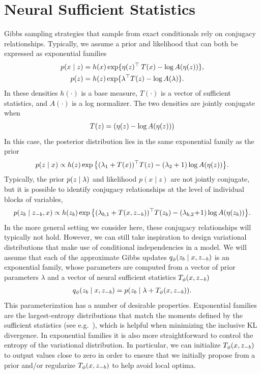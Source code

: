 \documentclass[anonymous=false, %
               format=acmsmall, %
               review=true, %
               screen=true, %
               nonacm=true]{acmart}
\theoremstyle{definition}
\begin{document}
\section{Neural Sufficient Statistics}
Gibbs sampling strategies that sample from exact conditionals rely on conjugacy relationships. Typically, we assume a prior and likelihood that can both be expressed as exponential families
\begin{align*}
    p(x \mid z) 
    &= 
    h(x) \exp \{ 
        \eta(z)^\top \: T(x)  
        -\log A(\eta(z)) \}, 
    \\
    p(z ) 
    &= 
    h(z) \exp \{ 
        \lambda^\top T(z) 
        - \log A(\lambda) \}.
\end{align*}
In these densities $h(\cdot)$ is a base measure, $T(\cdot)$ is a vector of sufficient statistics, and $A(\cdot)$ is a log normalizer. The two densities are jointly conjugate when
\begin{align*}
    T(z) = (\eta(z) -\log A(\eta(z)))
\end{align*}
In this case, the posterior distribution lies in the same exponential family as the prior
\begin{align*}
    p(z \mid x) 
    \propto 
    h(z)
    \exp 
    \big\{
         (\lambda_1 + T(x))^\top T(z) 
        -
        (\lambda_2 + 1) 
        \log A(\eta(z))
    \big\}
    .
\end{align*}
Typically, the prior $p(z \mid \lambda)$ and likelihood $p(x \mid z)$ are not jointly conjugate, but it is possible to identify conjugacy relationships at the level of individual blocks of variables, 
\begin{align*}
    p(z_b \mid z_{-b}, x)
    \propto
    h(z_b) 
    \exp \big\{ 
        (\lambda_{b,1} + T(x, z_{-b}))^\top T(z_b) 
        -
        (\lambda_{b,2} \!+\! 1) 
        \log A(\eta(z_b))
    \big\}
    .
\end{align*}
In the more general setting we consider here, these conjugacy relationships will typically not hold. However, we can still take inspiration to design variational distributions that make use of conditional independencies in a model. We will assume that each of the approximate Gibbs updates $q_\phi(z_b \mid x, z_{-b})$ is an exponential family, whose parameters are computed from a vector of prior parameters $\lambda$ and a vector of neural sufficient statistics $T_\phi(x, z_{-b})$
\begin{align}
    q_\phi(z_b \mid x, z_{-b}) 
    = 
    p(z_b \mid \lambda + T_\phi(x, z_{-b}))
    .
\end{align}
This parameterization has a number of desirable properties. Exponential families are the largest-entropy distributions that match the moments defined by the sufficient statistics (see e.g.~\cite{wainwright2008graphical}), which is helpful when minimizing the inclusive KL divergence. In exponential families it is also more straightforward to control the entropy of the variational distribution. In particular, we can initialize $T_\phi(x, z_{-b})$ to output values close to zero in order to ensure that we initially propose from a prior and/or regularize $T_\phi(x, z_{-b})$ to help avoid local optima.
\end{document}
